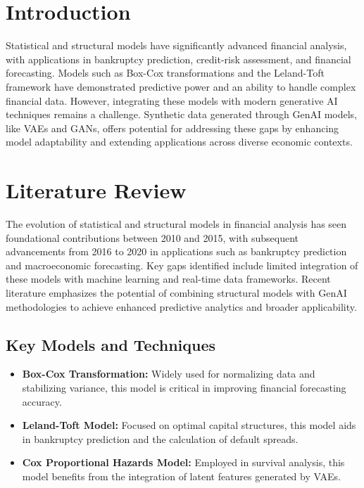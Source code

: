 \documentclass[a4paper,headinclude=on,footinclude=on,12pt,oneside]{scrbook}
\begin{document}
\section{Introduction}
Statistical and structural models have significantly advanced financial analysis, with applications in bankruptcy prediction, credit-risk assessment, and financial forecasting. Models such as Box-Cox transformations and the Leland-Toft framework have demonstrated predictive power and an ability to handle complex financial data. However, integrating these models with modern generative AI techniques remains a challenge. Synthetic data generated through GenAI models, like VAEs and GANs, offers potential for addressing these gaps by enhancing model adaptability and extending applications across diverse economic contexts.

\section{Literature Review}
The evolution of statistical and structural models in financial analysis has seen foundational contributions between 2010 and 2015, with subsequent advancements from 2016 to 2020 in applications such as bankruptcy prediction and macroeconomic forecasting. Key gaps identified include limited integration of these models with machine learning and real-time data frameworks. Recent literature emphasizes the potential of combining structural models with GenAI methodologies to achieve enhanced predictive analytics and broader applicability.

\subsection{Key Models and Techniques}
\begin{itemize}
	\item \textbf{Box-Cox Transformation:} Widely used for normalizing data and stabilizing variance, this model is critical in improving financial forecasting accuracy.
	\item \textbf{Leland-Toft Model:} Focused on optimal capital structures, this model aids in bankruptcy prediction and the calculation of default spreads.
	\item \textbf{Cox Proportional Hazards Model:} Employed in survival analysis, this model benefits from the integration of latent features generated by VAEs.
\end{itemize}
\end{document}
